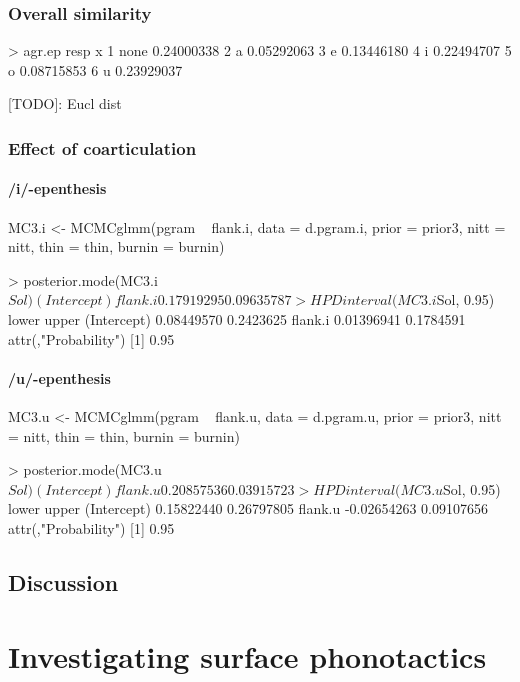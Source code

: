 \subsubsection{Overall similarity}
{\color{red}
> agr.ep
  resp          x
1 none 0.24000338
2    a 0.05292063
3    e 0.13446180
4    i 0.22494707
5    o 0.08715853
6    u 0.23929037

[TODO]: Eucl dist

\subsubsection{Effect of coarticulation}

\paragraph{/i/-epenthesis}
MC3.i <- MCMCglmm(pgram ~ flank.i,
                    data = d.pgram.i, prior = prior3,
                    nitt = nitt, thin = thin, burnin = burnin)

> posterior.mode(MC3.i$Sol)
(Intercept)     flank.i 
 0.17919295  0.09635787 
> HPDinterval(MC3.i$Sol, 0.95)
                 lower     upper
(Intercept) 0.08449570 0.2423625
flank.i     0.01396941 0.1784591
attr(,"Probability")
[1] 0.95      

\paragraph{/u/-epenthesis}
MC3.u <- MCMCglmm(pgram ~ flank.u,
                    data = d.pgram.u, prior = prior3,
                    nitt = nitt, thin = thin, burnin = burnin)

> posterior.mode(MC3.u$Sol)
(Intercept)     flank.u 
 0.20857536  0.03915723 
> HPDinterval(MC3.u$Sol, 0.95)
                  lower      upper
(Intercept)  0.15822440 0.26797805
flank.u     -0.02654263 0.09107656
attr(,"Probability")
[1] 0.95
}
\subsection{Discussion}



\section{{\color{red}Investigating surface phonotactics}} \label{3-surfphono}

